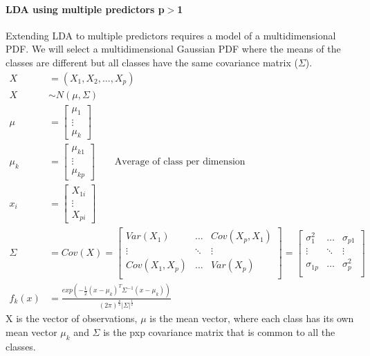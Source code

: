 \documentclass[../document.tex]{subfiles}
\begin{document}
	\paragraph{LDA using multiple predictors p\(>\)1}
	Extending LDA to multiple predictors requires a model of a multidimensional PDF. We will select a multidimensional Gaussian PDF where the means of the classes are different but all classes have the same covariance matrix ($\Sigma$).
	\begin{equation}
	\begin{split}
		X&=(X_{1},X_{2},...,X_{p})\\
		X&\sim N(\mu,\Sigma)\\
		\mu&= \left[\begin{matrix}\mu_{1} \\ \vdots \\ \mu_{k} \end{matrix}\right]\\
		\mu_k &= \left[\begin{matrix}\mu_{k1} \\ \vdots \\ \mu_{kp} \end{matrix}\right] \qquad \text{Average of class per dimension}\\
		x_i&=\left[\begin{matrix}X_{1i} \\ \vdots \\ X_{pi} \end{matrix}\right]\\
		\Sigma&=Cov(X)=\left[\begin{matrix}
				Var(X_1) &\dots& Cov(X_p, X_1)\\
				\vdots & \ddots & \vdots\\
				Cov(X_1, X_p) &\dots & Var(X_p)\\
			\end{matrix}\right]=\left[\begin{matrix}
				\sigma^2_1 &\dots& \sigma_{p1}\\
				\vdots & \ddots & \vdots\\
				\sigma_{1p} &\dots & \sigma^2_p\\
			\end{matrix}\right]\\
		f_k(x)&=\frac{exp(-\frac{1}{2}(x-\mu_k)^T\Sigma^{-1}(x-\mu_k))}{(2\pi)^\frac{p}{2}|\Sigma|^\frac{1}{2}}
	\end{split}
	\end{equation}
	X is the vector of observations, \(\mu\) is the mean vector, where each class has its own mean vector \(\mu_{k}\) and \(\Sigma\) is the pxp covariance matrix that is common to all the classes.
\end{document}
